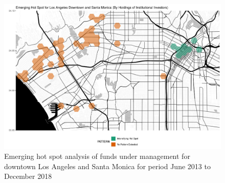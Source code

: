 \begin{figure}
	\centering
	\includegraphics[width=1\linewidth]{Figures/ChapterIV/LA_Money_EH_Downtown}
	\caption[Emerging Hot Spot Analysis of Funds Under Management for Downtown Los Angeles and Santa Monica 2013-2018]{Emerging hot spot analysis of funds under management for downtown Los Angeles and Santa Monica for period June 2013 to December 2018}
	\label{fig:LAmoneyhotspot_Downtown}
\end{figure}

